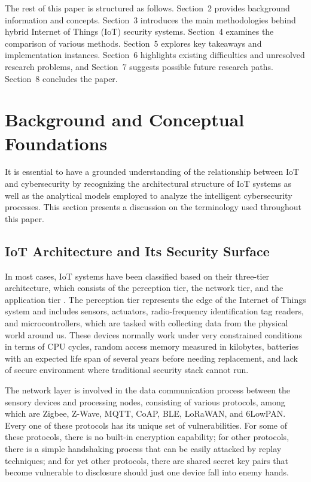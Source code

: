\documentclass[12pt]{article}
\begin{document}
The rest of this paper is structured as follows. Section~2 provides background information and concepts. Section~3 introduces the main methodologies behind hybrid Internet of Things (IoT) security systems. Section~4 examines the comparison of various methods. Section~5 explores key takeaways and implementation instances. Section~6 highlights existing difficulties and unresolved research problems, and Section~7 suggests possible future research paths. Section~8 concludes the paper.


\section{Background and Conceptual Foundations}

It is essential to have a grounded understanding of the relationship between IoT and cybersecurity by recognizing the architectural structure of IoT systems as well as the analytical models employed to analyze the intelligent cybersecurity processes. This section presents a discussion on the terminology used throughout this paper.

\subsection{IoT Architecture and Its Security Surface}

In most cases, IoT systems have been classified based on their three-tier architecture, which consists of the perception tier, the network tier, and the application tier \cite{al2015internet}. The perception tier represents the edge of the Internet of Things system and includes sensors, actuators, radio-frequency identification tag readers, and microcontrollers, which are tasked with collecting data from the physical world around us. These devices normally work under very constrained conditions in terms of CPU cycles, random access memory measured in kilobytes, batteries with an expected life span of several years before needing replacement, and lack of secure environment where traditional security stack cannot run.

The network layer is involved in the data communication process between the sensory devices and processing nodes, consisting of various protocols, among which are Zigbee, Z-Wave, MQTT, CoAP, BLE, LoRaWAN, and 6LowPAN. Every one of these protocols has its unique set of vulnerabilities. For some of these protocols, there is no built-in encryption capability; for other protocols, there is a simple handshaking process that can be easily attacked by replay techniques; and for yet other protocols, there are shared secret key pairs that become vulnerable to disclosure should just one device fall into enemy hands.
\end{document}
